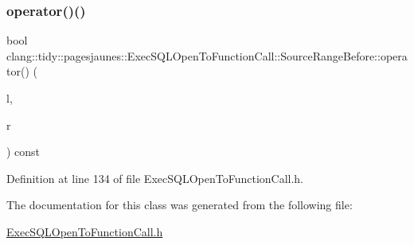 \subsubsection{\texorpdfstring{operator()()}{operator()()}}
{\footnotesize\ttfamily bool clang\+::tidy\+::pagesjaunes\+::\+Exec\+S\+Q\+L\+Open\+To\+Function\+Call\+::\+Source\+Range\+Before\+::operator() (\begin{DoxyParamCaption}\item[{const \hyperlink{classclang_1_1tidy_1_1pagesjaunes_1_1_exec_s_q_l_open_to_function_call_1_1_source_range_for_string_literals}{Source\+Range\+For\+String\+Literals} \&}]{l,  }\item[{const \hyperlink{classclang_1_1tidy_1_1pagesjaunes_1_1_exec_s_q_l_open_to_function_call_1_1_source_range_for_string_literals}{Source\+Range\+For\+String\+Literals} \&}]{r }\end{DoxyParamCaption}) const\hspace{0.3cm}{\ttfamily [inline]}}



Definition at line 134 of file Exec\+S\+Q\+L\+Open\+To\+Function\+Call.\+h.



The documentation for this class was generated from the following file\+:\begin{DoxyCompactItemize}
\item 
\hyperlink{_exec_s_q_l_open_to_function_call_8h}{Exec\+S\+Q\+L\+Open\+To\+Function\+Call.\+h}\end{DoxyCompactItemize}
